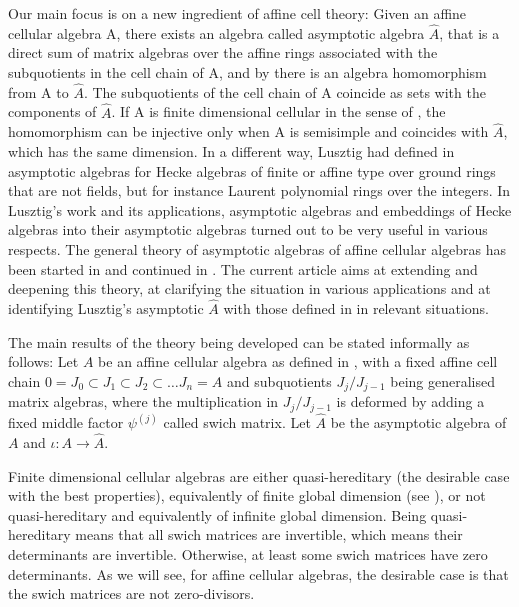 \documentclass[oneside, a4paper, 11pt]{amsart}
\begin{document}
Our main focus is on a new ingredient of affine cell theory: Given an affine
cellular algebra A, there exists \cite{KXaffine} an algebra called asymptotic
algebra $\hat{A}$, that is a direct sum of matrix algebras over the
affine rings associated with the subquotients in the cell chain of A, and
by \cite{KXaffine}
there is an algebra homomorphism from A to $\hat{A}$. The subquotients of the
cell chain of A coincide as sets with the components of $\hat{A}$. If A is
finite dimensional cellular in the sense of \cite{GrahamLehrer},
the homomorphism can be
injective only when A is semisimple and coincides with $\hat{A}$, which has
the same dimension. In a different way,
Lusztig had defined in \cite{Lusztig2} asymptotic algebras for Hecke algebras
of finite or affine type over ground rings that are not fields, but for
instance Laurent polynomial rings over the integers. In Lusztig's work and
its applications, asymptotic algebras and embeddings of Hecke algebras into
their asymptotic algebras turned out to be very useful in various respects. 
The general theory of asymptotic algebras of affine cellular algebras has been
started in \cite{KXaffine} and continued in \cite{CKLS}. The current article
aims at extending and deepening this theory, at clarifying the situation in
various applications and at identifying Lusztig's asymptotic $\hat{A}$
with those defined in \cite{KXaffine} in relevant situations.
\medskip

The main results of the theory being developed can be stated informally as
follows: Let $A$ be an affine cellular algebra as defined in \cite{KXaffine},
with a fixed affine cell chain $0=J_0 \subset J_1 \subset J_2 \subset \dots
J_n=A$ and subquotients $J_j/J_{j-1}$ being generalised matrix algebras, where
the multiplication in $J_j/J_{j-1}$ is deformed by adding a fixed middle factor
$\psi^{(j)}$ called swich matrix. Let
$\hat{A}$ be the asymptotic algebra of $A$ and $\iota: A \rightarrow \hat{A}$.
\smallskip

Finite dimensional cellular algebras are either quasi-hereditary
(the desirable case with the best properties), equivalently of finite global
dimension (see \cite{KXwhenis}), or not quasi-hereditary and equivalently
of infinite global dimension. Being quasi-hereditary means that all swich
matrices are invertible, which means their determinants are invertible.
Otherwise, at least some swich matrices have zero determinants.
As we will see, for affine cellular algebras, the desirable case is that the swich matrices are not zero-divisors. 
\end{document}
